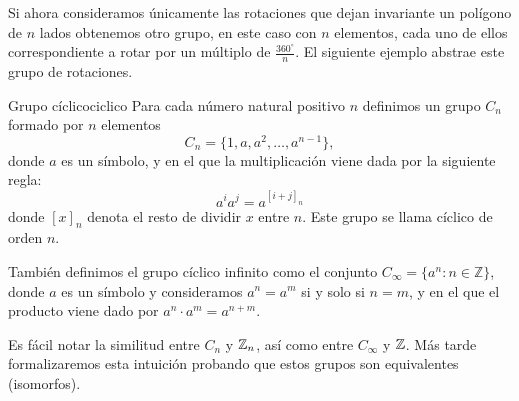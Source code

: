 Si ahora consideramos únicamente las rotaciones que dejan invariante un polígono de \(n\) lados obtenemos otro grupo, en este caso con \(n\) elementos, cada uno de ellos correspondiente a rotar por un múltiplo de $\frac{360^\circ}{n}$. El siguiente ejemplo abstrae este grupo de rotaciones.

\begin{example}{Grupo cíclico}{ciclico}
    Para cada número natural positivo \(n\) definimos un grupo \(C_n\) formado por \(n\) elementos
    \[
    C_n = \{1, a, a^2, \ldots, a^{n-1}\},
    \]
    donde \(a\) es un símbolo, y en el que la multiplicación viene dada por la siguiente regla:
    \[
    a^i a^j = a^{[i+j]_n}
    \]
    donde \([x]_n\) denota el resto de dividir \(x\) entre \(n\). Este grupo se llama {cíclico de orden \(n\)}.

    También definimos el {grupo cíclico infinito} como el conjunto \(C_\infty = \{a^n : n \in \mathbb{Z}\}\), donde \(a\) es un símbolo y consideramos \(a^n = a^m\) si y solo si \(n = m\), y en el que el producto viene dado por \(a^n \cdot a^m = a^{n+m}\).
\end{example}

\begin{remark}
    Es fácil notar la similitud entre $C_n$ y $\mathbb{Z}_n$, así como entre $C_\infty$ y $\mathbb{Z}$. Más tarde formalizaremos esta intuición probando que estos grupos son equivalentes (isomorfos).
\end{remark}